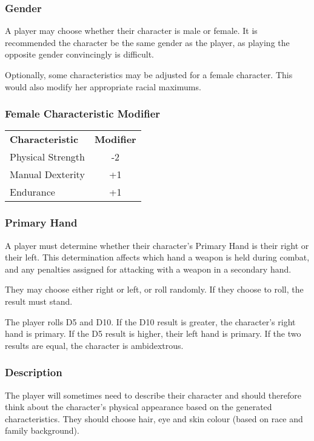 \begin{multicols*}{3}
\subsubsection{Gender}

A player may choose whether their character is male or female. It is
recommended the character be the same gender as the player, as playing
the opposite gender convincingly is difficult.

Optionally, some characteristics may be adjusted for a female
character. This would also modify her appropriate racial maximums.

\subsubsection{Female Characteristic Modifier}

\begin{tabular}{lc}
\textbf{Characteristic} & \textbf{Modifier} \\
Physical Strength 	& -2 \\
Manual Dexterity	& +1 \\
Endurance		& +1 \\
\end{tabular}

\subsubsection{Primary Hand}

A player must determine whether their character's Primary Hand is
their right or their left. This determination affects which hand a
weapon is held during combat, and any penalties assigned for attacking
with a weapon in a secondary hand.

They may choose either right or left, or roll randomly. If they choose
to roll, the result must stand.

The player rolls D5 and D10. If the D10 result is greater, the
character's right hand is primary. If the D5 result is higher, their
left hand is primary. If the two results are equal, the character is
ambidextrous.

\subsubsection{Description}
\label{chargen:description}

The player will sometimes need to describe their character and should
therefore think about the character's physical appearance based on the
generated characteristics. They should choose hair, eye and skin
colour (based on race and family background).


\end{multicols*}
